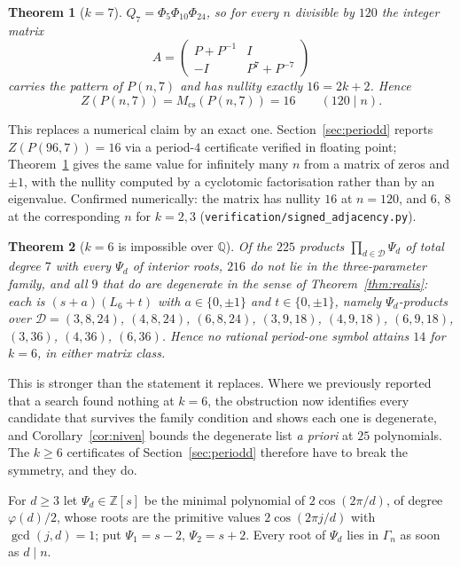 \documentclass[11pt]{article}
\newtheorem{theorem}{Theorem}
\theoremstyle{definition}
\begin{document}
\begin{theorem}[$k=7$]\label{thm:k7}
$Q_7=\Phi_5\Phi_{10}\Phi_{24}$, so for every $n$ divisible by $120$ the integer
matrix
\[
  A=\begin{pmatrix} P+P^{-1} & I\\ -I & P^{7}+P^{-7}\end{pmatrix}
\]
carries the pattern of $P(n,7)$ and has nullity exactly $16=2k+2$. Hence
\[
  Z(P(n,7))=M_{\mathrm{cs}}(P(n,7))=16 \qquad (120\mid n).
\]
\end{theorem}

\noindent
This replaces a numerical claim by an exact one. Section~\ref{sec:periodd}
reports $Z(P(96,7))=16$ via a period-$4$ certificate verified in floating point;
Theorem~\ref{thm:k7} gives the same value for infinitely many $n$ from a matrix
of zeros and $\pm1$, with the nullity computed by a cyclotomic factorisation
rather than by an eigenvalue. Confirmed numerically: the matrix has nullity
$16$ at $n=120$, and $6$, $8$ at the corresponding $n$ for $k=2,3$
(\texttt{verification/signed\_adjacency.py}).

\begin{theorem}[$k=6$ is impossible over $\mathbb Q$]\label{thm:k6imp}
Of the $225$ products $\prod_{d\in \mathcal D}\Psi_d$ of total degree $7$ with every
$\Psi_d$ of interior roots, $216$ do not lie in the three-parameter family, and
all $9$ that do are degenerate in the sense of Theorem~\ref{thm:realis}:
each is $(s+a)(L_6+t)$ with $a\in\{0,\pm1\}$ and $t\in\{0,\pm1\}$, namely
$\Psi_d$-products over $\mathcal D=(3,8,24)$, $(4,8,24)$, $(6,8,24)$, $(3,9,18)$,
$(4,9,18)$, $(6,9,18)$, $(3,36)$, $(4,36)$, $(6,36)$. Hence no rational
period-one symbol attains $14$ for $k=6$, in either matrix class.
\end{theorem}

\noindent
This is stronger than the statement it replaces. Where we previously reported
that a search found nothing at $k=6$, the obstruction now identifies every
candidate that survives the family condition and shows each one is degenerate,
and Corollary~\ref{cor:niven} bounds the degenerate list \emph{a priori} at
$25$ polynomials. The $k\ge6$ certificates of Section~\ref{sec:periodd}
therefore have to break the symmetry, and they do.



For $d\ge3$ let $\Psi_d\in\mathbb Z[s]$ be the minimal polynomial of
$2\cos(2\pi/d)$, of degree $\varphi(d)/2$, whose roots are the primitive
values $2\cos(2\pi j/d)$ with $\gcd(j,d)=1$; put $\Psi_1=s-2$, $\Psi_2=s+2$.
Every root of $\Psi_d$ lies in $\Gamma_n$ as soon as $d\mid n$.
\end{document}
